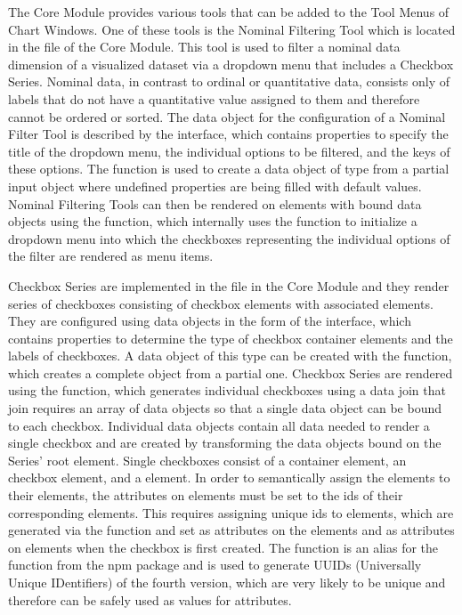 The Core Module provides various tools that can be added to the Tool Menus of Chart Windows.
One of these tools is the Nominal Filtering Tool which is located in the  file of the Core Module.
This tool is used to filter a nominal data dimension of a visualized dataset via a dropdown menu that includes a Checkbox Series.
Nominal data, in contrast to ordinal or quantitative data, consists only of labels that do not have a quantitative value assigned to them and therefore cannot be ordered or sorted.
The data object for the configuration of a Nominal Filter Tool is described by the  interface, which contains properties to specify the title of the dropdown menu, the individual options to be filtered, and the keys of these options. 
The  function is used to create a data object of type  from a partial input object where undefined properties are being filled with default values.
Nominal Filtering Tools can then be rendered on elements with bound  data objects using the  function, which internally uses the  function to initialize a dropdown menu into which the checkboxes representing the individual options of the filter are rendered as menu items.

Checkbox Series are implemented in the  file in the Core Module and they render series of checkboxes consisting of checkbox  elements with associated  elements.
They are configured using data objects in the form of the  interface, which contains properties to determine the type of checkbox container elements and the labels of checkboxes.
A data object of this type can be created with the  function, which creates a complete object from a partial one.
Checkbox Series are rendered using the  function, which generates individual checkboxes using a data join that join requires an array of  data objects so that a single data object can be bound to each checkbox.
Individual  data objects contain all data needed to render a single checkbox and are created by transforming the  data objects bound on the Series' root element.
Single checkboxes consist of a container element, an  checkbox element, and a  element.
In order to semantically assign the  elements to their  elements, the  attributes on  elements must be set to the ids of their corresponding  elements.
This requires assigning unique ids to  elements, which are generated via the  function and set as  attributes on the  elements and as  attributes on  elements when the checkbox is first created.
The  function is an alias for the  function from the  npm package \parencite{UUIDPackage} and is used to generate UUIDs (Universally Unique IDentifiers) \parencite{UUIDRFC} of the fourth version, which are very likely to be unique and therefore can be safely used as values for  attributes.

